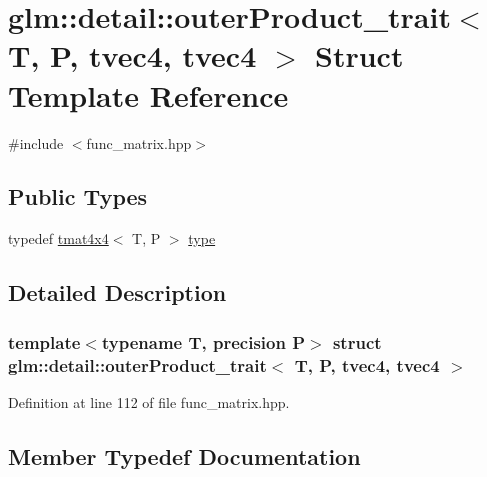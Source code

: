 \hypertarget{structglm_1_1detail_1_1outer_product__trait_3_01_t_00_01_p_00_01tvec4_00_01tvec4_01_4}{}\section{glm\+:\+:detail\+:\+:outer\+Product\+\_\+trait$<$ T, P, tvec4, tvec4 $>$ Struct Template Reference}
\label{structglm_1_1detail_1_1outer_product__trait_3_01_t_00_01_p_00_01tvec4_00_01tvec4_01_4}


{\ttfamily \#include $<$func\+\_\+matrix.\+hpp$>$}

\subsection*{Public Types}
\begin{DoxyCompactItemize}
\item 
typedef \hyperlink{structglm_1_1detail_1_1tmat4x4}{tmat4x4}$<$ T, P $>$ \hyperlink{structglm_1_1detail_1_1outer_product__trait_3_01_t_00_01_p_00_01tvec4_00_01tvec4_01_4_a89f0d2b33be6604293d1373176291811}{type}
\end{DoxyCompactItemize}


\subsection{Detailed Description}
\subsubsection*{template$<$typename T, precision P$>$\newline
struct glm\+::detail\+::outer\+Product\+\_\+trait$<$ T, P, tvec4, tvec4 $>$}



Definition at line 112 of file func\+\_\+matrix.\+hpp.



\subsection{Member Typedef Documentation}
\mbox{\label{structglm_1_1detail_1_1outer_product__trait_3_01_t_00_01_p_00_01tvec4_00_01tvec4_01_4_a89f0d2b33be6604293d1373176291811}} 
